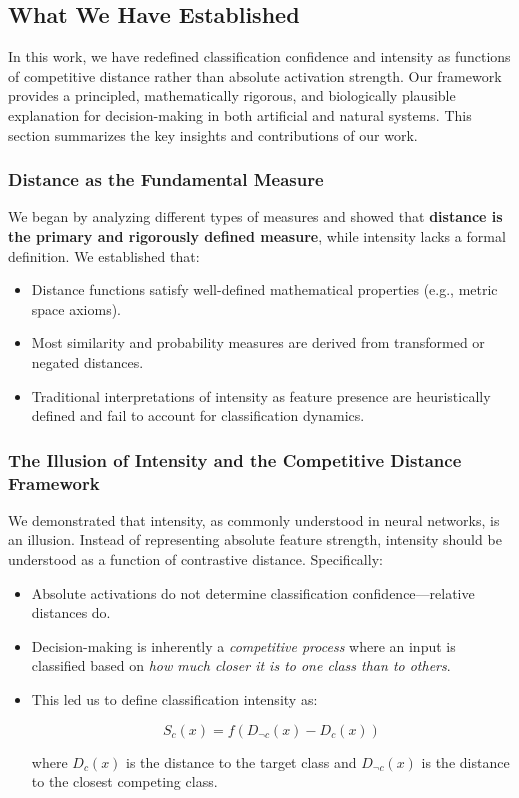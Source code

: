 \subsection{What We Have Established}

In this work, we have redefined classification confidence and intensity as functions of competitive distance rather than absolute activation strength. Our framework provides a principled, mathematically rigorous, and biologically plausible explanation for decision-making in both artificial and natural systems. This section summarizes the key insights and contributions of our work.

\subsubsection{Distance as the Fundamental Measure}

We began by analyzing different types of measures and showed that \textbf{distance is the primary and rigorously defined measure}, while intensity lacks a formal definition. We established that:

\begin{itemize}
    \item Distance functions satisfy well-defined mathematical properties (e.g., metric space axioms).
    \item Most similarity and probability measures are derived from transformed or negated distances.
    \item Traditional interpretations of intensity as feature presence are heuristically defined and fail to account for classification dynamics.
\end{itemize}

\subsubsection{The Illusion of Intensity and the Competitive Distance Framework}

We demonstrated that intensity, as commonly understood in neural networks, is an illusion. Instead of representing absolute feature strength, intensity should be understood as a function of contrastive distance. Specifically:

\begin{itemize}
    \item Absolute activations do not determine classification confidence—relative distances do.
    \item Decision-making is inherently a \textit{competitive process} where an input is classified based on \textit{how much closer it is to one class than to others}.
    \item This led us to define classification intensity as:
    
    \[
    S_c(x) = f(D_{\neg c}(x) - D_c(x))
    \]

    where \( D_c(x) \) is the distance to the target class and \( D_{\neg c}(x) \) is the distance to the closest competing class.
\end{itemize}

